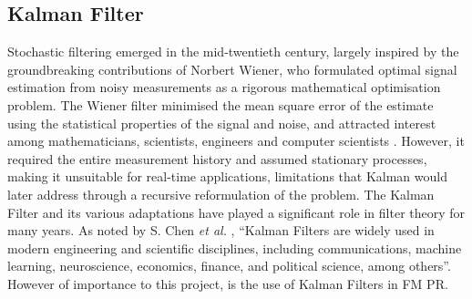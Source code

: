 \subsection{Kalman Filter}
Stochastic filtering emerged in the mid-twentieth century, largely inspired by the groundbreaking contributions of Norbert Wiener, who formulated optimal signal estimation from noisy measurements as a rigorous mathematical optimisation problem. The Wiener filter minimised the mean square error of the estimate using the statistical properties of the signal and noise, and attracted interest among mathematicians, scientists, engineers and computer scientists \cite{CHEN2003}. However, it required the entire measurement history and assumed stationary processes, making it unsuitable for real-time applications, limitations that Kalman would later address through a recursive reformulation of the problem.
The Kalman Filter and its various adaptations have played a significant role in filter theory for many years. As noted by S. Chen \textit{et al.} \cite{CHEN2}, \textquotedblleft Kalman Filters are widely used in modern engineering and scientific disciplines, including communications, machine learning, neuroscience, economics, finance, and political science, among others\textquotedblright. However of importance to this project, is the use of Kalman Filters in FM \ac{PR}.

